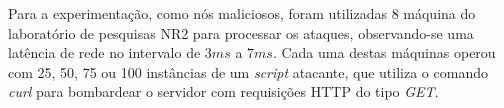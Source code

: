 Para a experimentação, como nós maliciosos, foram utilizadas 8 máquina do laboratório de pesquisas NR2 para processar os ataques, observando-se uma latência de rede no intervalo de $3ms$ a $7ms$. Cada uma destas máquinas operou com 25, 50, 75 ou 100 instâncias de um \emph{script} atacante, que utiliza o comando \emph{curl} para bombardear o servidor com requisições HTTP do tipo \emph{GET}. %


